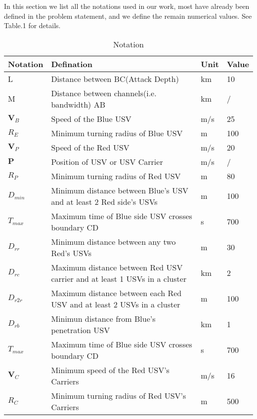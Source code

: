 \documentclass{mcmthesis}
\begin{document}
In this section we list all the notations used in our work, most have already been defined in the problem statement, and we define the remain numerical values. See Table.1 for details.


\begin{table} [H]
\small
\centering
\caption {Notation}
\begin{tabular}{|llll|}
\hline
Notation                       & Defination                                   & Unit & Value   \\ \hline
L                              & Distance between BC(Attack Depth)            & km   & 10      \\
M                              & Distance between channels(i.e. bandwidth) AB & km   &  /       \\
$\mathbf{V}_{B}$               & Speed of the Blue USV                        & m/s  & 25      \\ 
$R_{E}$      		   & Minimum turning radius of Blue USV           & m    &100\\
$\mathbf{V}_{P}$      		   & Speed of the Red USV                        & m/s    &20\\
$\mathbf{P} $      		   & Position of USV or USV Carrier                       & m/s    &/\\
$R_{P}$      				   & Minimum turning radius of Red USV           & m    &80\\
$D_{min}$      				           & Minimum distance between Blue's USV and at least 2 Red side's USVs          & m    &100\\
$T_{max}$      				   & Maximum time of Blue side USV crosses boundary CD     &s    &700\\
$D_{rr}$      				   & Minimum distance between any two Red's USVs    &m   &30\\
$D_{rc}$      				   & Maximum distance between Red USV carrier and at least 1 USVs in a cluster      &km    &2\\
$D_{r2r}$      				   & Maximum distance between each Red USV and at least 2 USVs in a cluster      &m    &100\\
$D_{rb}$                       &Minimun distance from Blue's penetration USV     &km   & 1\\
$T_{max}$      				   & Maximum time of Blue side USV crosses boundary CD     &s    &700\\
$\mathbf{V}_{C}$      				   & Minimum speed of the Red USV's Carriers          & m/s    &16\\
$R_{C}$      				   & Minimum turning radius of Red USV's Carriers            & m    &500\\ \hline
\end{tabular}
\end{table}
\end{document}
